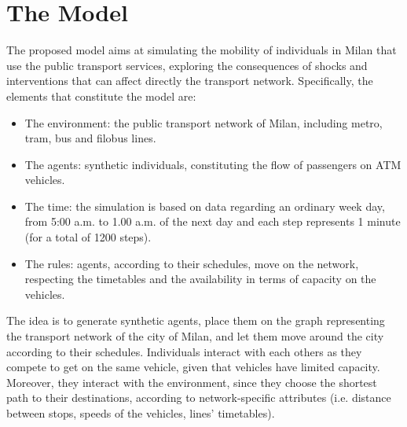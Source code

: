 \section{The Model}
The proposed model aims at simulating the mobility of individuals in Milan that use the public transport services, exploring the consequences of shocks and interventions that can affect directly the transport network. Specifically, the elements that constitute the model are:
\begin{itemize}
    \item The environment: the public transport network of Milan, including metro, tram, bus and filobus lines. 
    \item The agents: synthetic individuals, constituting the flow of passengers on ATM vehicles.
    \item The time: the simulation is based on data regarding an ordinary week day, from 5:00 a.m. to 1.00 a.m. of the next day and each step represents 1 minute (for a total of 1200 steps).
    \item The rules: agents, according to their schedules, move on the network, respecting the timetables and the availability in terms of capacity on the vehicles.
\end{itemize}
The idea is to generate synthetic agents, place them on the graph representing the transport network of the city of Milan, and let them move around the city according to their schedules. Individuals interact with each others as they compete to get on the same vehicle, given that vehicles have limited capacity. Moreover, they interact with the environment, since they choose the shortest path to their destinations, according to network-specific attributes (i.e. distance between stops, speeds of the vehicles, lines' timetables). 

